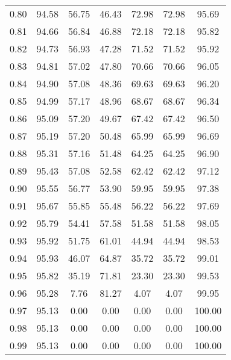\begin{tabular}{|c|c|c|c|c|c|c|}
      0.80 &     94.58 &     56.75 &      46.43 &   72.98 &      72.98 &         95.69 \\
      0.81 &     94.66 &     56.84 &      46.88 &   72.18 &      72.18 &         95.82 \\
      0.82 &     94.73 &     56.93 &      47.28 &   71.52 &      71.52 &         95.92 \\
      0.83 &     94.81 &     57.02 &      47.80 &   70.66 &      70.66 &         96.05 \\
      0.84 &     94.90 &     57.08 &      48.36 &   69.63 &      69.63 &         96.20 \\
      0.85 &     94.99 &     57.17 &      48.96 &   68.67 &      68.67 &         96.34 \\
      0.86 &     95.09 &     57.20 &      49.67 &   67.42 &      67.42 &         96.50 \\
      0.87 &     95.19 &     57.20 &      50.48 &   65.99 &      65.99 &         96.69 \\
      0.88 &     95.31 &     57.16 &      51.48 &   64.25 &      64.25 &         96.90 \\
      0.89 &     95.43 &     57.08 &      52.58 &   62.42 &      62.42 &         97.12 \\
      0.90 &     95.55 &     56.77 &      53.90 &   59.95 &      59.95 &         97.38 \\
      0.91 &     95.67 &     55.85 &      55.48 &   56.22 &      56.22 &         97.69 \\
      0.92 &     95.79 &     54.41 &      57.58 &   51.58 &      51.58 &         98.05 \\
      0.93 &     95.92 &     51.75 &      61.01 &   44.94 &      44.94 &         98.53 \\
      0.94 &     95.93 &     46.07 &      64.87 &   35.72 &      35.72 &         99.01 \\
      0.95 &     95.82 &     35.19 &      71.81 &   23.30 &      23.30 &         99.53 \\
      0.96 &     95.28 &      7.76 &      81.27 &    4.07 &       4.07 &         99.95 \\
      0.97 &     95.13 &      0.00 &       0.00 &    0.00 &       0.00 &        100.00 \\
      0.98 &     95.13 &      0.00 &       0.00 &    0.00 &       0.00 &        100.00 \\
      0.99 &     95.13 &      0.00 &       0.00 &    0.00 &       0.00 &        100.00 \\
\bottomrule
\end{tabular}
